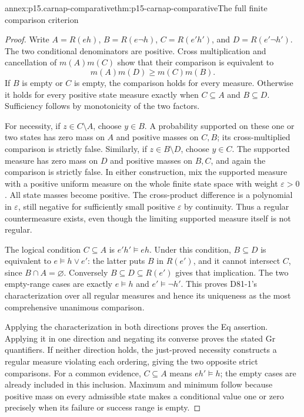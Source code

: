 \begin{annexitem}{annex:p15.carnap-comparative}{thm:p15-carnap-comparative}{The full finite comparison criterion}
\begin{proof}
Write \(A=R(eh)\), \(B=R(e\neg h)\),
\(C=R(e'h')\), and \(D=R(e'\neg h')\). The two conditional
denominators are positive. Cross multiplication and cancellation of
\(m(A)m(C)\) show that their comparison is equivalent to
\[
 m(A)m(D)\geq m(C)m(B).
\]
If \(B\) is empty or \(C\) is empty, the comparison holds for
every measure. Otherwise it holds for every positive state measure
exactly when \(C\subseteq A\) and \(B\subseteq D\).
Sufficiency follows by monotonicity of the two factors.

For necessity, if \(z\in C\setminus A\), choose
\(y\in B\). A probability supported on these one or two states
has zero mass on \(A\) and positive masses on \(C,B\); its
cross-multiplied comparison is strictly false. Similarly, if
\(z\in B\setminus D\), choose \(y\in C\). The supported
measure has zero mass on \(D\) and positive masses on \(B,C\),
and again the comparison is strictly false. In either construction,
mix the supported measure with a positive uniform measure on the
whole finite state space with weight \(\varepsilon>0\). All state
masses become positive. The cross-product difference is a polynomial
in \(\varepsilon\), still negative for sufficiently small positive
\(\varepsilon\) by continuity. Thus a regular countermeasure
exists, even though the limiting supported measure itself is not regular.

The logical condition \(C\subseteq A\) is
\(e'h'\models eh\). Under this condition,
\(B\subseteq D\) is equivalent to \(e\models h\lor e'\):
the latter puts \(B\) in \(R(e')\), and it cannot intersect
\(C\), since \(B\cap A=\varnothing\). Conversely
\(B\subseteq D\subseteq R(e')\) gives that implication.
The two empty-range cases are exactly \(e\models h\) and
\(e'\models\neg h'\). This proves D81-1's characterization
over all regular measures and hence its uniqueness as the most
comprehensive unanimous comparison.

Applying the characterization in both directions proves the Eq
assertion. Applying it in one direction and negating its converse proves
the stated Gr quantifiers. If neither direction holds, the just-proved
necessity constructs a regular measure violating each ordering, giving
the two opposite strict comparisons. For a common evidence,
\(C\subseteq A\) means \(eh'\models h\); the empty cases
are already included in this inclusion. Maximum and minimum follow
because positive mass on every admissible state makes a conditional
value one or zero precisely when its failure or success range is empty.


\end{proof}
\end{annexitem}
